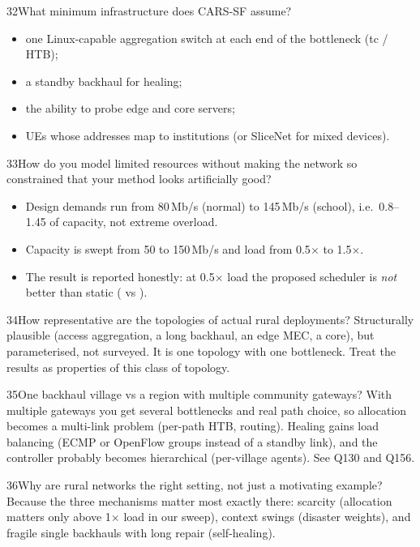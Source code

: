 \begin{qa}{32}{What minimum infrastructure does CARS-SF assume?}
\begin{itemize}
\item one Linux-capable aggregation switch at each end of the bottleneck (tc / HTB);
\item a standby backhaul for healing;
\item the ability to probe edge and core servers;
\item UEs whose addresses map to institutions (or SliceNet for mixed devices).
\end{itemize}
\end{qa}

\begin{qa}{33}{How do you model limited resources without making the network so constrained that your method looks artificially good?}
\begin{itemize}
\item Design demands run from 80\,Mb/s (normal) to 145\,Mb/s (school), i.e.\ 0.8--1.45 of capacity, not extreme overload.
\item Capacity is swept from 50 to 150\,Mb/s and load from 0.5$\times$ to 1.5$\times$.
\item The result is reported honestly: at 0.5$\times$ load the proposed scheduler is \emph{not} better than static
(\NSensLoadSchoolProposedZeropFive{} vs \NSensLoadSchoolStaticZeropFive).
\end{itemize}
\end{qa}

\begin{qa}{34}{How representative are the topologies of actual rural deployments?}
Structurally plausible (access aggregation, a long backhaul, an edge MEC, a core), but parameterised, not surveyed.
It is one topology with one bottleneck. Treat the results as properties of this class of topology.
\end{qa}

\begin{qa}{35}{One backhaul village vs a region with multiple community gateways?}
With multiple gateways you get several bottlenecks and real path choice, so allocation becomes a multi-link problem
(per-path HTB, routing). Healing gains load balancing (ECMP or OpenFlow groups instead of a standby link), and the
controller probably becomes hierarchical (per-village agents). See Q130 and Q156.
\end{qa}

\begin{qa}{36}{Why are rural networks the right setting, not just a motivating example?}
Because the three mechanisms matter most exactly there: scarcity (allocation matters only above 1$\times$ load in
our sweep), context swings (disaster weights), and fragile single backhauls with long repair (self-healing).
\end{qa}

